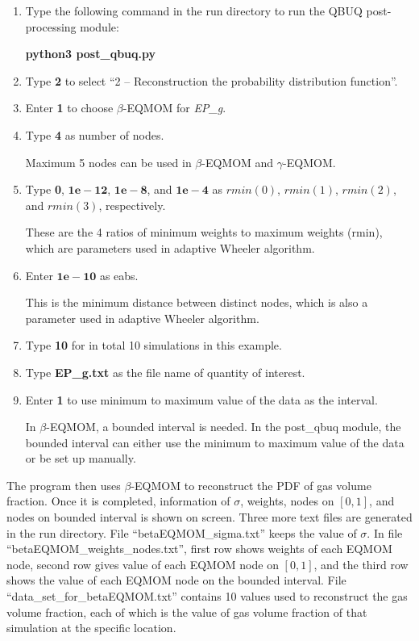 \documentclass[a4paper,12pt,titlepage]{article}
\begin{document}
\begin{enumerate}[leftmargin=0cm,itemindent=0.5cm]
 \item Type the following command in the run directory to run the QBUQ 
 post-processing module:
 
 \textbf{python3 post\_qbuq.py}
 
 \item Type \textbf{2} to select ``2 -- Reconstruction the probability 
 distribution function''.
 
 \item Enter \textbf{1} to choose $\beta$-EQMOM for \emph{EP\_g}.
 
 \item Type \textbf{4} as number of nodes.
 
 Maximum 5 nodes can be used in $\beta$-EQMOM and $\gamma$-EQMOM.
 
 \item Type \textbf{0}, $\mathbf{1e-12}$, $\mathbf{1e-8}$, and $\mathbf{1e-4}$
 as $rmin(0)$, $rmin(1)$, $rmin(2)$, and $rmin(3)$, respectively.
 
 These are the 4 ratios of minimum weights to maximum weights (rmin), which are 
 parameters used in adaptive Wheeler algorithm\cite{YuanFox2011}.
 
 \item Enter $\mathbf{1e-10}$ as eabs.
 
 This is the minimum distance between distinct nodes, which is also a parameter 
 used in adaptive Wheeler algorithm\cite{YuanFox2011}.
 
 \item Type \textbf{10} for in total 10 simulations in this example.
 
 \item Type \textbf{EP\_g.txt} as the file name of quantity of interest.
 
 \item Enter \textbf{1} to use minimum to maximum value of the data as the 
 interval.
 
 In $\beta$-EQMOM, a bounded interval is needed. In the post\_qbuq module, the 
 bounded interval can either use the minimum to maximum value of the data or be
 set up manually.
\end{enumerate}

The program then uses $\beta$-EQMOM to reconstruct the PDF of gas volume 
fraction. Once it is completed, information of $\sigma$, weights, nodes on 
$[0,1]$, and nodes on bounded interval is shown on screen. Three more text files
are generated in the run directory. File ``betaEQMOM\_sigma.txt'' keeps the 
value of $\sigma$. In file ``betaEQMOM\_weights\_nodes.txt'', first row shows
weights of each EQMOM node, second row gives value of each EQMOM node on 
$[0,1]$, and the third row shows the value of each EQMOM node on the bounded
interval. File ``data\_set\_for\_betaEQMOM.txt'' contains 10 values used to 
reconstruct the gas volume fraction, each of which is the value of gas volume
fraction of that simulation at the specific location.
\end{document}
